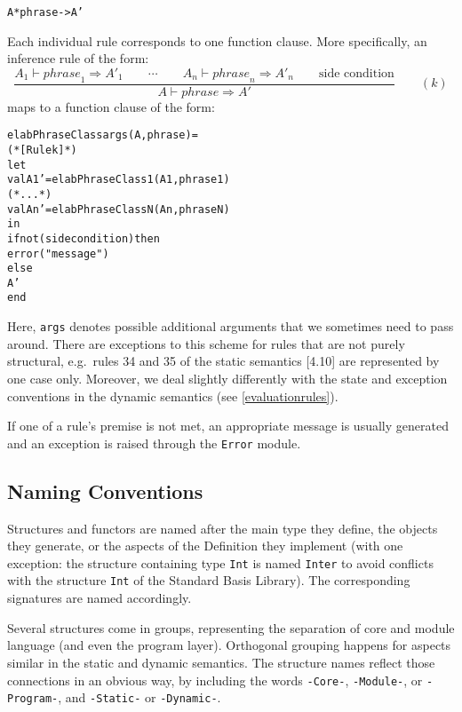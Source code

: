 \documentclass[twoside,titlepage]{article}
\begin{document}
\begin{quoting}
\begin{alltt}
\hfill A * phrase -> A' \hfill
\end{alltt}
\end{quoting}

Each individual rule corresponds to one function clause. More specifically, an inference rule of the form:
%
\begin{displaymath}
\frac{
A_1 \vdash \mathit{phrase}_1 \Rightarrow A'_1
\qquad
\cdots
\qquad
A_n \vdash \mathit{phrase}_n \Rightarrow A'_n
\qquad
\mbox{side condition}
}{
A \vdash \mathit{phrase} \Rightarrow A'
}
\qquad (k)
\end{displaymath}
%
maps to a function clause of the form:

\begin{quoting}
\begin{alltt}
elabPhraseClass args (A, phrase) =
(* [Rule k] *)
let
  val A1' = elabPhraseClass1(A1, phrase1)
  (* ... *)
  val An' = elabPhraseClassN(An, phraseN)
in
  if not(side condition) then
    error("message")
  else
    A'
end
\end{alltt}
\end{quoting}

Here, {\tt args} denotes possible additional arguments that we sometimes need to pass around. There are exceptions to this scheme for rules that are not purely structural, e.g.\ rules 34 and 35 of the static semantics [4.10] are represented by one case only. Moreover, we deal slightly differently with the state and exception conventions in the dynamic semantics (see \ref{evaluationrules}).

If one of a rule's premise is not met, an appropriate message is usually generated and an exception is raised through the {\tt Error} module.


\subsection{Naming Conventions}
\label{naming}

Structures and functors are named after the main type they define, the objects they generate, or the aspects of the Definition they implement (with one exception: the structure containing type {\tt Int} is named {\tt Inter} to avoid conflicts with the structure {\tt Int} of the Standard Basis Library). The corresponding signatures are named accordingly.

Several structures come in groups, representing the separation of core and module language (and even the program layer). Orthogonal grouping happens for aspects similar in the static and dynamic semantics. The structure names reflect those connections in an obvious way, by including the words {\tt -Core-}, {\tt -Module-}, or {\tt -Program-}, and {\tt -Static-} or {\tt -Dynamic-}.
\end{document}
